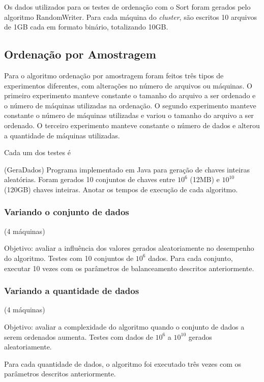 Os dados utilizados para os testes de ordenação com o Sort foram gerados pelo algoritmo RandomWriter. Para cada máquina do \textit{cluster}, são escritos 10 arquivos de 1GB cada em formato binário, totalizando 10GB.
% 




\subsection{Ordenação por Amostragem}

Para o algoritmo ordenação por amostragem foram feitos três tipos de experimentos diferentes, com alterações no número de arquivos ou máquinas. O primeiro experimento manteve constante o tamanho do arquivo a ser ordenado e o número de máquinas utilizadas na ordenação. O segundo experimento manteve constante o número de máquinas utilizadas e variou o tamanho do arquivo a ser ordenado. O terceiro experimento manteve constante o número de dados e alterou a quantidade de máquinas utilizadas. 

Cada um dos testes é 

(GeraDados)
Programa implementado em Java para geração de chaves inteiras aleatórias.
Foram gerados 10 conjuntos de chaves entre $10^{6}$ (12MB) e  $10^{10}$ (120GB) chaves inteiras. 
Anotar os tempos de execução de cada algoritmo.

\subsubsection{Variando o conjunto de dados} 
 (4 máquinas)

Objetivo: avaliar a influência dos valores gerados aleatoriamente no desempenho do algoritmo. 
Testes com 10 conjuntos de $10^{6}$ dados. 
Para cada conjunto, executar 10 vezes com os parâmetros de balanceamento descritos anteriormente. 

\subsubsection{Variando a quantidade de dados} (4 máquinas)
 
Objetivo: avaliar a complexidade do algoritmo quando o conjunto de dados a serem ordenados aumenta.
Testes com dados de $10^{6}$ a $10^{10}$ gerados aleatoriamente.
 
 Para cada quantidade de dados, o algoritmo foi executado três vezes com os parâmetros descritos anteriormente. 
 
